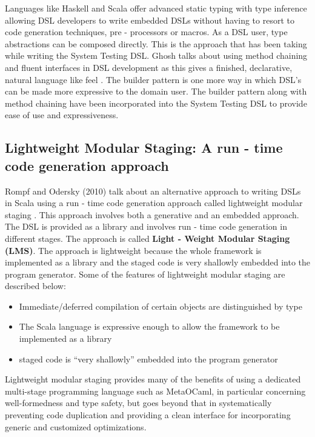 \documentclass[12 pt]{article}
\begin{document}
\noindent
Languages like Haskell and Scala offer advanced static typing with type inference allowing DSL developers to write embedded DSLs without having to resort to code generation techniques, pre - processors or macros. As a DSL user, type abstractions can be composed directly. This is the approach that has been taking while writing the System Testing DSL. Ghosh talks about using method chaining and fluent interfaces in DSL development as this gives a finished, declarative, natural language like feel \cite{fluentInterface}. The builder pattern is one more way in which DSL's can be made more expressive to the domain user. The builder pattern along with method chaining have been incorporated into the System Testing DSL to provide ease of use and expressiveness.

\subsection{Lightweight Modular Staging: A run - time code generation approach}
Rompf and Odersky (2010) talk about an alternative approach to writing DSLs in Scala using a run - time code generation approach called lightweight modular staging \cite{lms}. This approach involves both a generative and an embedded approach. The DSL is provided as a library and involves run - time code generation in different stages. The approach is called \textbf{Light - Weight Modular Staging (LMS)}. The approach is lightweight because the whole framework is implemented as a library and the staged code is very shallowly embedded into the program generator. Some of the features of lightweight modular staging are described below:
\begin{itemize}
\item Immediate/deferred compilation of certain objects are distinguished by type
\item The Scala language is expressive enough to allow the framework to be implemented as a library
\item staged code is “very shallowly” embedded into the program generator
\end{itemize}
\bigskip

\noindent
Lightweight modular staging provides many of the benefits of using a dedicated multi-stage programming language such as MetaOCaml, in particular concerning well-formedness and type safety, but goes beyond that in systematically preventing code duplication and providing a clean interface for incorporating generic and customized optimizations.
\end{document}
